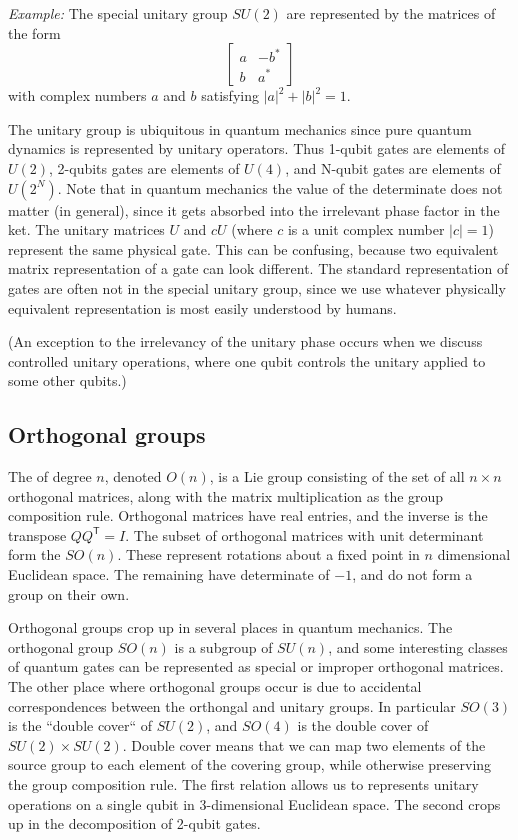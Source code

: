 {\sl Example:} The special unitary group $SU(2)$ are represented by the matrices of the form
\[
\begin{bmatrix}
a & -b^* \\
b & a^*
\end{bmatrix}
\]
with complex numbers $a$ and $b$ satisfying $|a|^2 + |b|^2 = 1$.

The unitary group is ubiquitous in quantum mechanics since pure quantum dynamics is represented by unitary operators. Thus 1-qubit gates are elements of $U(2)$, 2-qubits gates are elements of $U(4)$, and N-qubit gates are elements of $U(2^N)$. Note that in quantum mechanics the value of the determinate does not matter (in general), since it gets absorbed into the irrelevant phase factor in the ket. The unitary matrices $U$ and $cU$ (where $c$ is a unit complex number $|c|=1$) represent the same physical gate. This can be confusing, because two equivalent matrix representation of a gate can look different. The standard representation of gates are often not in the special unitary group, since we use whatever physically equivalent representation is most easily understood by humans. 

(An exception to the irrelevancy of the unitary phase occurs when we discuss controlled unitary operations, where one qubit controls the unitary applied to some other qubits.)


\newcommand{\T}{\mathsf{T}}

\subsection{Orthogonal groups}
The  of degree $n$, denoted $O(n)$, is a Lie group consisting of the set of all $n\times n$ orthogonal matrices, along with the matrix multiplication as the group composition rule. Orthogonal matrices have real entries, and the inverse is the transpose $QQ^\T=I$. The subset of orthogonal matrices with unit determinant form the  $SO(n)$. These represent rotations about a fixed point in $n$ dimensional Euclidean space. The remaining  have determinate of $-1$, and do not form a group on their own. 

Orthogonal groups crop up in several places in quantum mechanics. The orthogonal group $SO(n)$ is a subgroup of $SU(n)$, and some interesting classes of quantum gates can be represented as special or improper orthogonal matrices. The other place where orthogonal groups occur is due to accidental correspondences between the orthongal and unitary groups. In particular $SO(3)$ is the ``double cover`` of $SU(2)$, and $SO(4)$ is the double cover of $SU(2)\times SU(2)$. Double cover means that we can map two elements of the source group to each element of the covering group, while otherwise preserving the group composition rule.  The first relation allows us to represents unitary operations on a single qubit in 3-dimensional Euclidean space. The second crops up in the decomposition of 2-qubit gates. 


